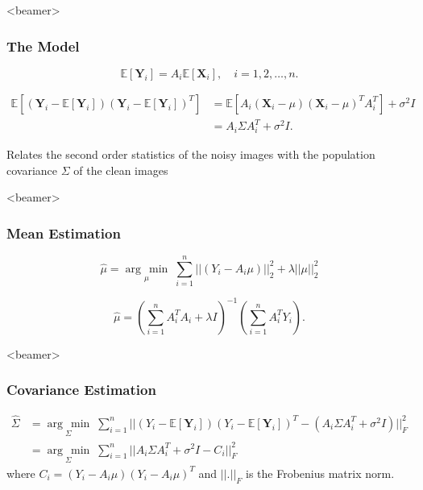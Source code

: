 \documentclass{beamer}
\newcommand{\argmin}[1]{\underset{#1}{\operatorname{arg}\,\operatorname{min}}\;}
\begin{document}
\begin{frame}<beamer>
\frametitle{The Model}
\begin{equation*}
\mathbb{E}[\textbf{Y}_i]=A_i \mathbb{E}[\textbf{X}_i], \quad i=1,2,\ldots,n.
\label{eqn:exp_y}
\end{equation*}

\begin{equation*}
\begin{aligned}
\mathbb{E}[(\textbf{Y}_i-\mathbb{E}[\textbf{Y}_i])(\textbf{Y}_i-\mathbb{E}[\textbf{Y}_i])^T] 
&= \mathbb{E} [A_i(\textbf{X}_i-\mu)(\textbf{X}_i-\mu)^T A_i^T] + \sigma^2I \\
&=  A_i \Sigma A_i^T + \sigma^2I .
\end{aligned}
\label{eqn:expectation_eq}
\end{equation*}

Relates the second order statistics of the noisy images with the 
population covariance $\Sigma$ of the clean images
\end{frame}



\begin{frame}<beamer>
\frametitle{Mean Estimation}

\begin{equation*}
 \hat\mu = \argmin{\mu} \sum_{i=1}^n||(Y_i-A_i\mu)||_2^2 + \lambda||\mu||_2^2
\end{equation*}

\begin{equation*}
 \hat\mu = (\sum_{i=1}^n A_i^T A_i + \lambda I)^{-1}(\sum_{i=1}^n 
A_i^T Y_i).
\label{eq:ls_mean_sol}
\end{equation*}
\end{frame}


\begin{frame}<beamer>
\frametitle{Covariance Estimation}
\begin{equation*}
\begin{aligned}
\hat\Sigma 
&= \argmin{\Sigma} \sum_{i=1}^n || (Y_i - \mathbb{E}[\textbf{Y}_i]) (Y_i - \mathbb{E}[\textbf{Y}_i])^T
- (A_i \Sigma A_i^T + \sigma^2 I)||_F^2 \\
&= \argmin{\Sigma} \sum_{i=1}^n || A_i\Sigma A_i^T + \sigma^2 I - C_i  ||_F^2 
\end{aligned}
\label{eqn:ls1}
\end{equation*}
where $C_i=(Y_i - A_i \mu) (Y_i - A_i \mu)^T$ and $||.||_F$ is the Frobenius matrix norm. 
\end{frame}
\end{document}
